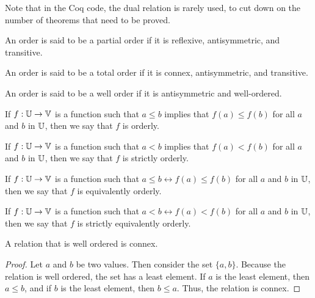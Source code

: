 \documentclass[../../math.tex]{subfiles}
\begin{document}
Note that in the Coq code, the dual relation is rarely used, to cut down on the
number of theorems that need to be proved.

\begin{class}
    An order is said to be a partial order if it is reflexive, antisymmetric,
    and transitive.
\end{class}

\begin{class}
    An order is said to be a total order if it is connex, antisymmetric, and
    transitive.
\end{class}

\begin{class}
    An order is said to be a well order if it is antisymmetric and well-ordered.
\end{class}

\begin{class}
    If $f : \mathbb{U} \to \mathbb{V}$ is a function such that $a \leq b$ implies that $f(a)
    \leq f(b)$ for all $a$ and $b$ in $\mathbb{U}$, then we say that $f$ is orderly.
\end{class}

\begin{class}
    If $f : \mathbb{U} \to \mathbb{V}$ is a function such that $a < b$ implies that $f(a) <
    f(b)$ for all $a$ and $b$ in $\mathbb{U}$, then we say that $f$ is strictly orderly.
\end{class}

\begin{class}
    If $f : \mathbb{U} \to \mathbb{V}$ is a function such that $a \leq b \leftrightarrow f(a)
    \leq f(b)$ for all $a$ and $b$ in $\mathbb{U}$, then we say that $f$ is equivalently
    orderly.
\end{class}

\begin{class}
    If $f : \mathbb{U} \to \mathbb{V}$ is a function such that $a < b \leftrightarrow f(a) <
    f(b)$ for all $a$ and $b$ in $\mathbb{U}$, then we say that $f$ is strictly
    equivalently orderly.
\end{class}

\begin{instance} \label{wo_connex}
    A relation that is well ordered is connex.
\end{instance}
\begin{proof}
    Let $a$ and $b$ be two values.  Then consider the set $\{a, b\}$.  Because
    the relation is well ordered, the set has a least element.  If $a$ is the
    least element, then $a \leq b$, and if $b$ is the least element, then $b
    \leq a$.  Thus, the relation is connex.
\end{proof}
\end{document}
